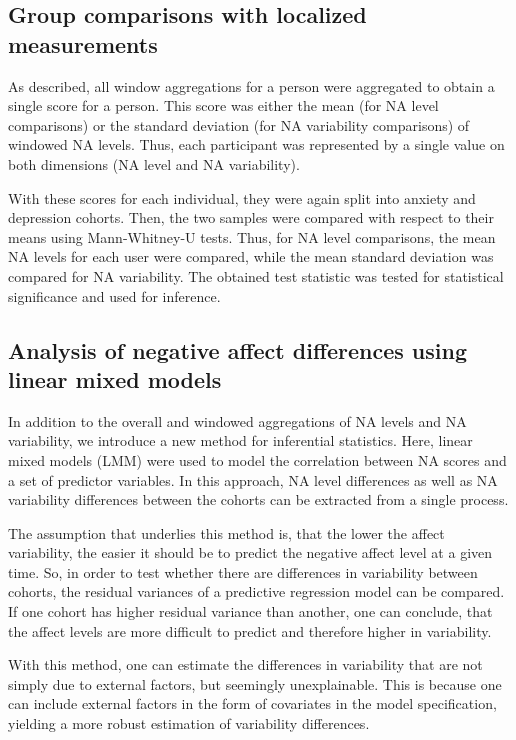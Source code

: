 \subsection{Group comparisons with localized measurements}

As described, all window aggregations for a person were aggregated to obtain a single score for a person. This score was either the mean (for NA level comparisons) or the standard deviation (for NA variability comparisons) of windowed NA levels. Thus, each participant was represented by a single value on both dimensions (NA level and NA variability).

With these scores for each individual, they were again split into anxiety and depression cohorts. Then, the two samples were compared with respect to their means using Mann-Whitney-U tests. Thus, for NA level comparisons, the mean NA levels for each user were compared, while the mean standard deviation was compared for NA variability. The obtained test statistic was tested for statistical significance and used for inference.

\subsection{Analysis of negative affect differences using linear mixed models}

In addition to the overall and windowed aggregations of NA levels and NA variability, we introduce a new method for inferential statistics. Here, linear mixed models (LMM) were used to model the correlation between NA scores and a set of predictor variables. In this approach, NA level differences as well as NA variability differences between the cohorts can be extracted from a single process.

The assumption that underlies this method is, that the lower the affect variability, the easier it should be to predict the negative affect level at a given time. So, in order to test whether there are differences in variability between cohorts, the residual variances of a predictive regression model can be compared. If one cohort has higher residual variance than another, one can conclude, that the affect levels are more difficult to predict and therefore higher in variability.

With this method, one can estimate the differences in variability that are not simply due to external factors, but seemingly unexplainable. This is because one can include external factors in the form of covariates in the model specification, yielding a more robust estimation of variability differences.

